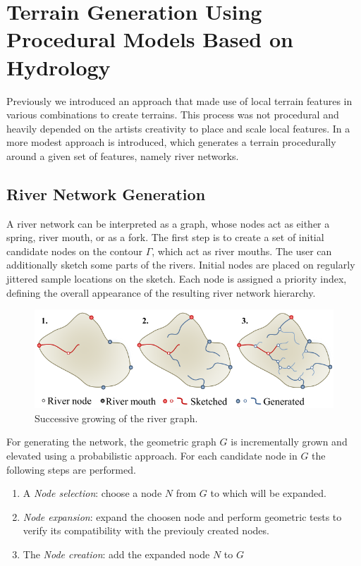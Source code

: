 \section{Terrain Generation Using Procedural Models Based on Hydrology}
\label{sec:Hydrology}
Previously we introduced an approach that made use of local terrain features in various combinations to create terrains. This process was not procedural and heavily depended on the artists creativity to place and scale local features. In \cite{Genevaux:2013:TGU:2461912.2461996} a more modest approach is introduced, which generates a terrain procedurally around a given set of features, namely river networks.
 
\subsection{River Network Generation}
A river network can be interpreted as a graph, whose nodes act as either a spring, river mouth, or as a fork. 
The first step is to create a set of initial candidate nodes on the contour $\Gamma$, which act as river mouths. The user can additionally sketch some parts of the rivers. Initial nodes are placed on regularly jittered sample locations on the sketch. Each node is assigned a priority index, defining the overall appearance of the resulting river network hierarchy. 

\begin{figure}[htb]
	\centering
	\includegraphics[width=\linewidth]{GGG13/river_network_sketch}
	\caption{Successive growing of the river graph. }
	\label{fig:river_network_sketch}
\end{figure}

For generating the network, the geometric graph $G$ is incrementally grown and elevated using a probabilistic approach. For each candidate node in $G$ the following steps are performed. 
\begin{enumerate}
	\item A \textit{Node selection}: choose a node $N$ from $G$ to which will be expanded.
	\item \textit{Node expansion}: expand the choosen node and perform geometric tests to verify its compatibility with the previouly created nodes. 
	\item The \textit{Node creation}: add the expanded node $N$ to $G$ 
\end{enumerate}

